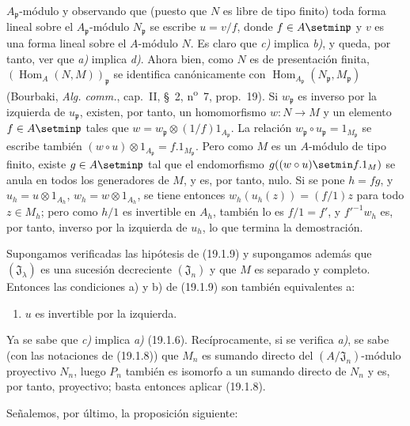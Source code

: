 $A_{\mathfrak p}$-módulo y observando que (puesto que $N$ es libre de tipo
finito) toda forma lineal sobre el $A_{\mathfrak p}$-módulo
$N_{\mathfrak p}$ se escribe $u=v/f$, donde $f\in A\setmin\mathfrak p$ y $v$ es una
forma lineal sobre el $A$-módulo $N$. Es claro que \emph{c)} implica \emph{b)}, y queda, por
tanto, ver que \emph{a)} implica \emph{d)}. Ahora bien, como $N$ es de presentación finita,
$(\operatorname{Hom}_A(N,M))_{\mathfrak p}$ se identifica canónicamente con
$\operatorname{Hom}_{A_{\mathfrak p}}(N_{\mathfrak p},M_{\mathfrak p})$
(Bourbaki, \emph{Alg. comm.}, cap.~II, §~2, n\textsuperscript{o}~7,
prop.~19). Si $w_{\mathfrak p}$ es inverso por la izquierda de $u_{\mathfrak p}$,
existen, por tanto, un homomorfismo $w:N\to M$ y un elemento $f\in A\setmin\mathfrak p$ tales que
$w=w_{\mathfrak p}\otimes(1/f)1_{A_{\mathfrak p}}$. La relación
$w_{\mathfrak p}\circ u_{\mathfrak p}=1_{M_{\mathfrak p}}$ se escribe también
$(w\circ u)\otimes1_{A_{\mathfrak p}}=f.1_{M_{\mathfrak p}}$. Pero como $M$
es un $A$-módulo de tipo finito, existe $g\in A\setmin\mathfrak p$ tal que el
endomorfismo $g((w\circ u)\setmin f.1_M)$ se anula en todos los generadores de $M$, y
es, por tanto, nulo. Si se pone $h=fg$, y
$u_h=u\otimes1_{A_h}$, $w_h=w\otimes1_{A_h}$, se tiene entonces
$w_h(u_h(z))=(f/1)z$ para todo $z\in M_h$; pero como $h/1$ es invertible en
$A_h$, también lo es $f/1=f'$, y $f'^{-1}w_h$ es, por tanto, inverso por la
izquierda de $u_h$, lo que termina la demostración.

\begin{proposition}[19.1.13]
\label{0.19.1.13-fr}
Supongamos verificadas las hipótesis de \textup{(19.1.9)} y supongamos además que
$(\mathfrak J_\lambda)$ es una sucesión decreciente $(\mathfrak J_n)$ y que $M$
es separado y completo. Entonces las condiciones \textup{a)} y \textup{b)} de \textup{(19.1.9)} son
también equivalentes a:
\begin{enumerate}
  \item[\textup{c)}] $u$ es invertible por la izquierda.
\end{enumerate}
\end{proposition}

Ya se sabe que \emph{c)} implica \emph{a)} (19.1.6). Recíprocamente, si se verifica \emph{a)}, se
sabe (con las notaciones de (19.1.8)) que $M_n$ es sumando directo del
$(A/\mathfrak J_n)$-módulo proyectivo $N_n$, luego $P_n$ también es isomorfo a
un sumando directo de $N_n$ y es, por tanto, proyectivo; basta entonces aplicar
(19.1.8).

Señalemos, por último, la proposición siguiente:

